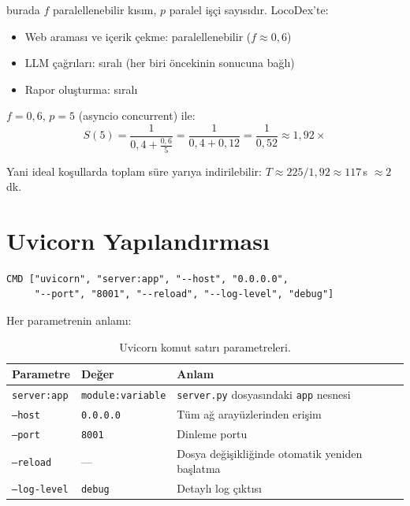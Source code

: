 \noindent burada $f$ paralellenebilir k{\i}s{\i}m, $p$ paralel i\c{s}\c{c}i say{\i}s{\i}d{\i}r. LocoDex'te:
\begin{itemize}
  \item Web araması ve i\c{c}erik \c{c}ekme: paralellenebilir ($f \approx 0{,}6$)
  \item LLM \c{c}a\u{g}r{\i}lar{\i}: s{\i}ral{\i} (her biri \"{o}ncekinin sonucuna ba\u{g}l{\i})
  \item Rapor olu\c{s}turma: s{\i}ral{\i}
\end{itemize}

$f = 0{,}6$, $p = 5$ (asyncio concurrent) ile:
\begin{equation}
S(5) = \frac{1}{0{,}4 + \frac{0{,}6}{5}} = \frac{1}{0{,}4 + 0{,}12} = \frac{1}{0{,}52} \approx 1{,}92\times
\end{equation}

\noindent Yani ideal ko\c{s}ullarda toplam s\"{u}re yar{\i}ya indirilebilir: $T \approx 225 / 1{,}92 \approx 117$\,s $\approx 2$\,dk.

\section{Uvicorn Yap{\i}land{\i}rmas{\i}}
\label{sec:deploy-uvicorn}

\begin{verbatim}
CMD ["uvicorn", "server:app", "--host", "0.0.0.0",
     "--port", "8001", "--reload", "--log-level", "debug"]
\end{verbatim}

Her parametrenin anlam{\i}:

\begin{table}[H]
\centering
\caption{Uvicorn komut sat{\i}r{\i} parametreleri.}
\label{tab:uvicorn-params}
\begin{tabular}{lll}
\toprule
\textbf{Parametre} & \textbf{De\u{g}er} & \textbf{Anlam} \\
\midrule
\texttt{server:app} & \texttt{module:variable} & \texttt{server.py} dosyas{\i}ndaki \texttt{app} nesnesi \\
\texttt{--host} & \texttt{0.0.0.0} & T\"{u}m a\u{g} aray\"{u}zlerinden eri\c{s}im \\
\texttt{--port} & \texttt{8001} & Dinleme portu \\
\texttt{--reload} & --- & Dosya de\u{g}i\c{s}ikli\u{g}inde otomatik yeniden ba\c{s}latma \\
\texttt{--log-level} & \texttt{debug} & Detayl{\i} log \c{c}{\i}kt{\i}s{\i} \\
\bottomrule
\end{tabular}
\end{table}

